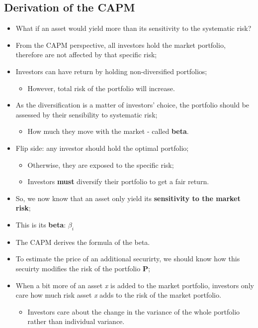 \documentclass[11pt,a4paper]{report}
\begin{document}
\subsection{Derivation of the CAPM}
\begin{itemize}
    \item What if an asset would yield more than its sensitivity to the systematic risk?
    \item From the CAPM perspective, all investors hold the market portfolio, therefore are not affected by that specific risk;
    \item Investors can have return by holding non-diversified portfolios;
    \begin{itemize}
        \item However, total risk of the portfolio will increase.
    \end{itemize}
    \item As the diversification is a matter of investors' choice, the portfolio should be assessed by their sensibility to systematic risk;
    \begin{itemize}
        \item How much they move with the market - called \textbf{beta}.
    \end{itemize}
    \item Flip side: any investor should hold the optimal portfolio;
    \begin{itemize}
        \item Otherwise, they are exposed to the specific risk;
        \item Investors \textbf{must} diversify their portfolio to get a fair return.
    \end{itemize}
    \item So, we now know that an asset only yield its \textbf{sensitivity to the market risk};
    \item This is its \textbf{beta}: $\beta_i$
    \item The CAPM derives the formula of the beta.
    \item To estimate the price of an additional securirty, we should know how this secuirty modifies the risk of the portfolio \textbf{P};
    \item When a bit more of an asset \textit{x} is added to the market portfolio, investors only care how much risk asset \textit{x} adds to the risk of the market portfolio.
    \begin{itemize}
        \item Investors care about the change in the variance of the whole portfolio rather than individual variance.

\end{itemize}
\end{itemize}
\end{document}
